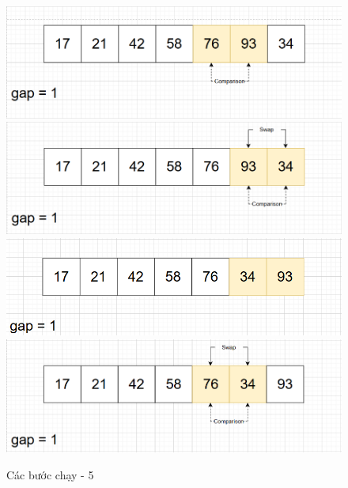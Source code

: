\begin{figure}[H]
    \centering
    \includegraphics[width=1\linewidth]{img/shell_sort/17.png}
    \vspace{0.15cm}
    \includegraphics[width=1\linewidth]{img/shell_sort/18.png}
    \vspace{0.15cm}
    \includegraphics[width=1\linewidth]{img/shell_sort/19.png}
    \vspace{0.15cm}
    \includegraphics[width=1\linewidth]{img/shell_sort/20.png}
    \caption{Các bước chạy - 5}
    \label{fig:part5}
\end{figure}

